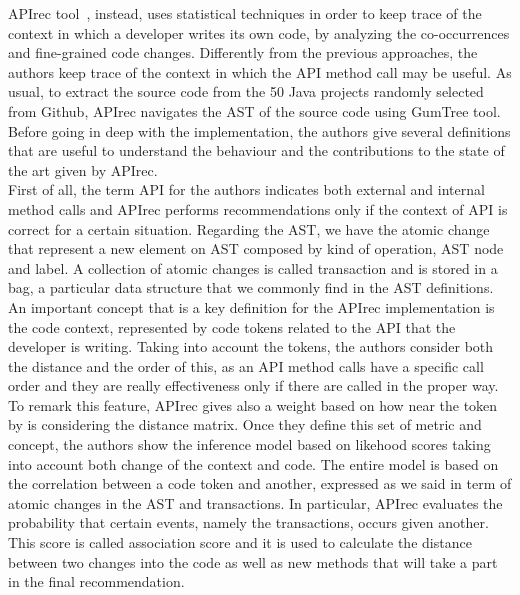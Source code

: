 APIrec tool~\cite{nguyen_api_2016}, instead, uses statistical techniques in order to keep trace of the context in which a developer writes its own code, by analyzing the co-occurrences and fine-grained code changes. Differently from the previous approaches, the authors keep trace of the context in which the API method call may be useful. As usual, to extract the source code from the 50 Java projects randomly selected from Github, APIrec navigates the AST of the source code using GumTree tool. Before going in deep with the implementation, the authors give several definitions that are useful to understand the behaviour and the contributions to the state of the art given by APIrec. \\
First of all, the term API for the authors indicates both external and internal method calls and APIrec performs recommendations only if the context of API is correct for a certain situation. Regarding the AST, we have the atomic change that represent a new element on AST composed by kind of operation, AST node and label. A collection of atomic changes is called transaction and is stored in a bag, a particular data structure that we commonly find in the AST definitions. An important concept that is a key definition for the APIrec implementation is the code context, represented by code tokens related to the API that the developer is writing. Taking into account the tokens, the authors consider both the distance and the order of this, as an API method calls have a specific call order and they are really effectiveness only if there are called in the proper way. To remark this feature, APIrec gives also a weight based on how near the token by is considering the distance matrix. Once they define this set of metric and concept, the authors show the inference model based on likehood scores taking into account both change of the context and code.\newline
The entire model is based on the correlation between a code token and another, expressed as we said in term of atomic changes in the AST and transactions. In particular, APIrec evaluates the probability that certain events, namely the transactions, occurs given another. This score is called association score and it is used to calculate the distance between two changes into the code as well as new methods that will take a part in the final recommendation. \\
